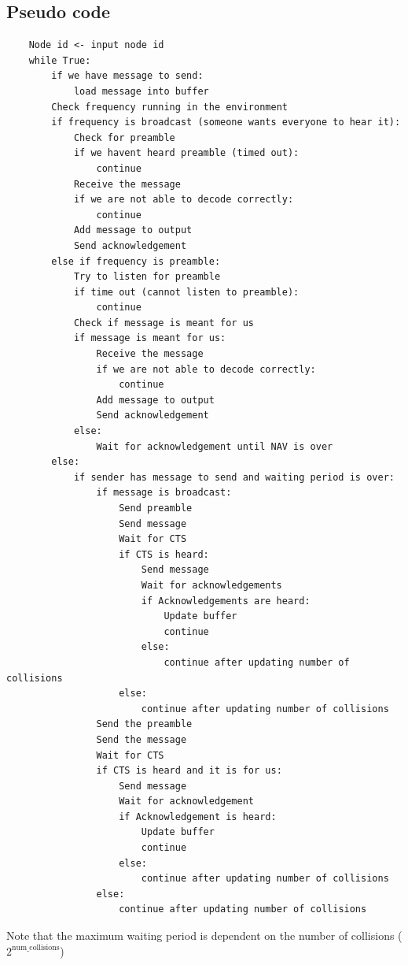 \documentclass[a4paper,12pt]{article}
\begin{document}
\subsection{Pseudo code}
\begin{lstlisting}
    Node id <- input node id
    while True:
        if we have message to send:
            load message into buffer
        Check frequency running in the environment
        if frequency is broadcast (someone wants everyone to hear it):
            Check for preamble
            if we havent heard preamble (timed out):
                continue
            Receive the message
            if we are not able to decode correctly:
                continue
            Add message to output
            Send acknowledgement
        else if frequency is preamble:
            Try to listen for preamble
            if time out (cannot listen to preamble):
                continue
            Check if message is meant for us
            if message is meant for us:
                Receive the message
                if we are not able to decode correctly:
                    continue
                Add message to output
                Send acknowledgement
            else:
                Wait for acknowledgement until NAV is over
        else:
            if sender has message to send and waiting period is over:
                if message is broadcast:
                    Send preamble
                    Send message
                    Wait for CTS 
                    if CTS is heard:
                        Send message
                        Wait for acknowledgements
                        if Acknowledgements are heard:
                            Update buffer
                            continue
                        else:
                            continue after updating number of collisions
                    else:
                        continue after updating number of collisions
                Send the preamble
                Send the message
                Wait for CTS 
                if CTS is heard and it is for us:
                    Send message
                    Wait for acknowledgement
                    if Acknowledgement is heard:
                        Update buffer
                        continue
                    else:
                        continue after updating number of collisions
                else:
                    continue after updating number of collisions
\end{lstlisting}

 Note that the maximum waiting period is dependent on the number of collisions ($2^{\text{num\_collisions}}$)
\end{document}
